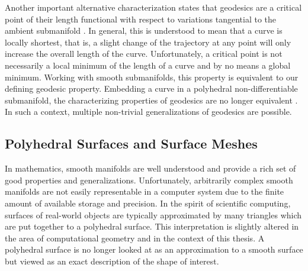 \documentclass{stdlocal}
\begin{document}
  Another important alternative characterization states that geodesics are a critical point of their length functional with respect to variations tangential to the ambient submanifold \autocite{polthier2006}.
  In general, this is understood to mean that a curve is locally shortest, that is, a slight change of the trajectory at any point will only increase the overall length of the curve.
  Unfortunately, a critical point is not necessarily a local minimum of the length of a curve and by no means a global minimum.
  Working with smooth submanifolds, this property is equivalent to our defining geodesic property.
  Embedding a curve in a polyhedral non-differentiable submanifold, the characterizing properties of geodesics are no longer equivalent \autocite{polthier2006}.
  In such a context, multiple non-trivial generalizations of geodesics are possible.





\subsection{Polyhedral Surfaces and Surface Meshes} %
\label{sub:polyhedral_surfaces}

  In mathematics, smooth manifolds are well understood and provide a rich set of good properties and generalizations.
  Unfortunately, arbitrarily complex smooth manifolds are not easily representable in a computer system due to the finite amount of available storage and precision.
  In the spirit of scientific computing, surfaces of real-world objects are typically approximated by many triangles which are put together to a polyhedral surface.
  This interpretation is slightly altered in the area of computational geometry and in the context of this thesis.
  A polyhedral surface is no longer looked at as an approximation to a smooth surface but viewed as an exact description of the shape of interest.
  \autocite{sharp2020}
\end{document}
